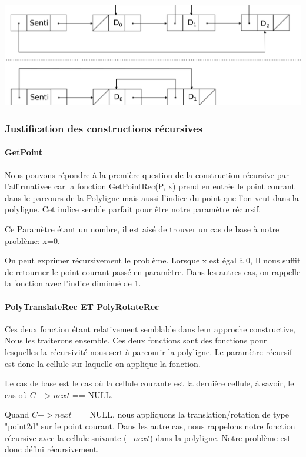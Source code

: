 \documentclass[a4paper, 11pt, oneside]{article}
\begin{document}
\includegraphics[scale=0.7]{supp.png}

\subsubsection{Justification des constructions récursives}



\paragraph{GetPoint}

Nous pouvons répondre à la première question de la construction récursive par l'affirmativee car la fonction GetPointRec(P, x) prend en entrée le point courant dans le parcours de la Polyligne mais aussi l'indice du point que l'on veut dans la polyligne. Cet indice semble parfait pour être notre paramètre récursif.

Ce Paramètre étant un nombre, il est aisé de trouver un cas de base à notre problème: x=0.

On peut exprimer récursivement le problème. Lorsque x est égal à 0, Il nous suffit de retourner le point courant passé en paramètre. Dans les autres cas, on rappelle la fonction avec l'indice diminué de 1.


\paragraph{PolyTranslateRec ET PolyRotateRec}
Ces deux fonction étant relativement semblable dans leur approche constructive, Nous les traiterons ensemble. Ces deux fonctions sont des fonctions pour lesquelles la récursivité nous sert à parcourir la polyligne. Le paramètre récursif est donc la cellule sur laquelle on applique la fonction. 

Le cas de base est le cas où la cellule courante est la dernière cellule, à savoir, le cas où $C->next$ == NULL.

Quand $C->next$ == NULL, nous appliquons la translation/rotation de type "point2d" sur le point courant. Dans les autre cas, nous rappelons notre fonction récursive avec la cellule suivante ($-next$) dans la polyligne. Notre problème est donc défini récursivement.
\end{document}
